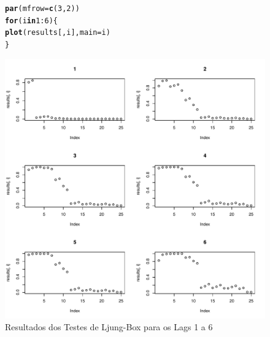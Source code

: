 \documentclass{article}\usepackage[]{graphicx}\usepackage[]{color}
\makeatletter
\def\maxwidth{ %
  \ifdim\Gin@nat@width>\linewidth
    \linewidth
  \else
    \Gin@nat@width
  \fi
}
\newcommand{\hlnum}[1]{\textcolor[rgb]{0.686,0.059,0.569}{#1}}%
\newcommand{\hlopt}[1]{\textcolor[rgb]{0,0,0}{#1}}%
\newcommand{\hlstd}[1]{\textcolor[rgb]{0.345,0.345,0.345}{#1}}%
\newcommand{\hlkwa}[1]{\textcolor[rgb]{0.161,0.373,0.58}{\textbf{#1}}}%
\newcommand{\hlkwc}[1]{\textcolor[rgb]{0.333,0.667,0.333}{#1}}%
\newcommand{\hlkwd}[1]{\textcolor[rgb]{0.737,0.353,0.396}{\textbf{#1}}}%
\newenvironment{kframe}{%
 \def\at@end@of@kframe{}%
 \ifinner\ifhmode%
  \def\at@end@of@kframe{\end{minipage}}%
  \begin{minipage}{\columnwidth}%
 \fi\fi%
 \def\FrameCommand##1{\hskip\@totalleftmargin \hskip-\fboxsep
 \colorbox{shadecolor}{##1}\hskip-\fboxsep
     \hskip-\linewidth \hskip-\@totalleftmargin \hskip\columnwidth}%
 \MakeFramed {\advance\hsize-\width
   \@totalleftmargin\z@ \linewidth\hsize
   \@setminipage}}%
 {\par\unskip\endMakeFramed%
 \at@end@of@kframe}
\newenvironment{knitrout}{}{} %
\makeatother
\begin{document}
            \begin{figure}[H]
            \caption{Resultados dos Testes de Ljung-Box para os Lags 1 a 6}
            \centering
\begin{knitrout}
\color{fgcolor}\begin{kframe}
\begin{alltt}
\hlkwd{par}\hlstd{(}\hlkwc{mfrow} \hlstd{=} \hlkwd{c}\hlstd{(}\hlnum{3}\hlstd{,}\hlnum{2}\hlstd{))}
\hlkwa{for} \hlstd{(i} \hlkwa{in} \hlnum{1}\hlopt{:}\hlnum{6}\hlstd{)\{}
  \hlkwd{plot}\hlstd{(results[,i],} \hlkwc{main}\hlstd{=i)}
\hlstd{\}}
\end{alltt}
\end{kframe}
\includegraphics[width=\maxwidth]{figure/unnamed-chunk-93-1} 

\end{knitrout}
            \end{figure}
            
\end{document}
